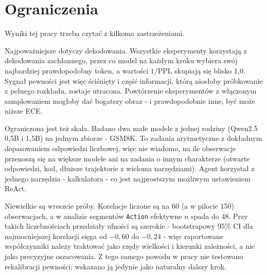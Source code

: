 
\section{Ograniczenia}
\label{sec:limitations}

Wyniki tej pracy trzeba czytać z kilkoma zastrzeżeniami.

Najpoważniejsze dotyczy dekodowania. Wszystkie eksperymenty
korzystają z dekodowania zachłannego, przez co model na każdym kroku
wybiera swój najbardziej prawdopodobny token, a wartości
$1/\mathrm{PPL}$ skupiają się blisko 1,0. Sygnał pewności jest więc
ściśnięty i część informacji, którą niosłoby próbkowanie z pełnego
rozkładu, zostaje utracona. Powtórzenie eksperymentów z włączonym
samplowaniem mogłoby dać bogatszy obraz - i prawdopodobnie inne,
być może niższe ECE.

Ograniczona jest też skala. Badano dwa małe modele z jednej rodziny
(Qwen2.5 0,5B i 1,5B) na jednym zbiorze - GSM8K. To zadania
arytmetyczne z dokładnym dopasowaniem odpowiedzi liczbowej, więc nie
wiadomo, na ile obserwacje przenoszą się na większe modele ani na
zadania o innym charakterze (otwarte odpowiedzi, kod, dłuższe
trajektorie z wieloma narzędziami). Agent korzystał z jednego
narzędzia - kalkulatora - co jest najprostszym możliwym ustawieniem
ReAct.

Niewielkie są wreszcie próby. Korelacje liczone są na 60 (a w pilocie
150) obserwacjach, a w analizie segmentów \texttt{Action} efektywne
$n$ spada do 48. Przy takich liczebnościach przedziały ufności są
szerokie - bootstrapowy 95\% CI dla najmocniejszej korelacji sięga
od $-0{,}60$ do $-0{,}24$ - więc raportowane współczynniki należy
traktować jako rzędy wielkości i kierunki zależności, a nie jako
precyzyjne oszacowania. Z tego samego powodu w pracy nie testowano
rekalibracji pewności; wskazano ją jedynie jako naturalny dalszy krok.
